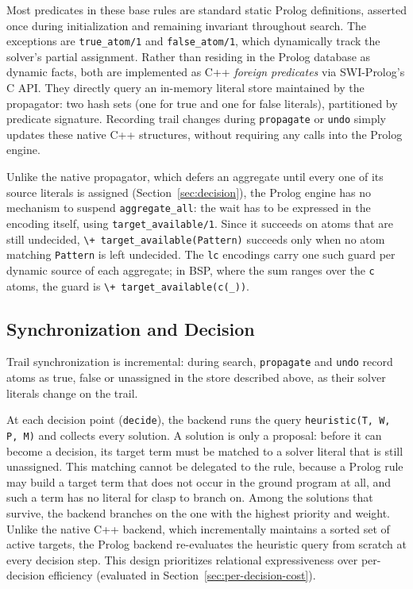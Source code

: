 Most predicates in these base rules are standard static Prolog definitions, asserted once during initialization and remaining invariant throughout search. The exceptions are \texttt{true\_atom/1} and \texttt{false\_atom/1}, which dynamically track the solver's partial assignment. Rather than residing in the Prolog database as dynamic facts, both are implemented as C++ \emph{foreign predicates} via SWI-Prolog's C API. They directly query an in-memory literal store maintained by the propagator: two hash sets (one for true and one for false literals), partitioned by predicate signature. Recording trail changes during \texttt{propagate} or \texttt{undo} simply updates these native C++ structures, without requiring any calls into the Prolog engine.


Unlike the native propagator, which defers an aggregate until every one of its source literals is assigned (Section~\ref{sec:decision}), the Prolog engine has no mechanism to suspend \texttt{aggregate\_all}: the wait has to be expressed in the encoding itself, using \texttt{target\_available/1}. Since it succeeds on atoms that are still undecided, \texttt{\textbackslash+ target\_available(Pattern)} succeeds only when no atom matching \texttt{Pattern} is left undecided. The \texttt{lc} encodings carry one such guard per dynamic source of each aggregate; in BSP, where the sum ranges over the \texttt{c} atoms, the guard is \texttt{\textbackslash+ target\_available(c(\_))}.

\subsection{Synchronization and Decision}
\label{sec:decision-prolog}

Trail synchronization is incremental: during search, \texttt{propagate} and \texttt{undo} record atoms as true, false or unassigned in the store described above, as their solver literals change on the trail.

At each decision point (\texttt{decide}), the backend runs the query \texttt{heuristic(T, W, P, M)} and collects every solution. A solution is only a proposal: before it can become a decision, its target term must be matched to a solver literal that is still unassigned. This matching cannot be delegated to the rule, because a Prolog rule may build a target term that does not occur in the ground program at all, and such a term has no literal for clasp to branch on. Among the solutions that survive, the backend branches on the one with the highest priority and weight. Unlike the native C++ backend, which incrementally maintains a sorted set of active targets, the Prolog backend re-evaluates the heuristic query from scratch at every decision step. This design prioritizes relational expressiveness over per-decision efficiency (evaluated in Section~\ref{sec:per-decision-cost}).

